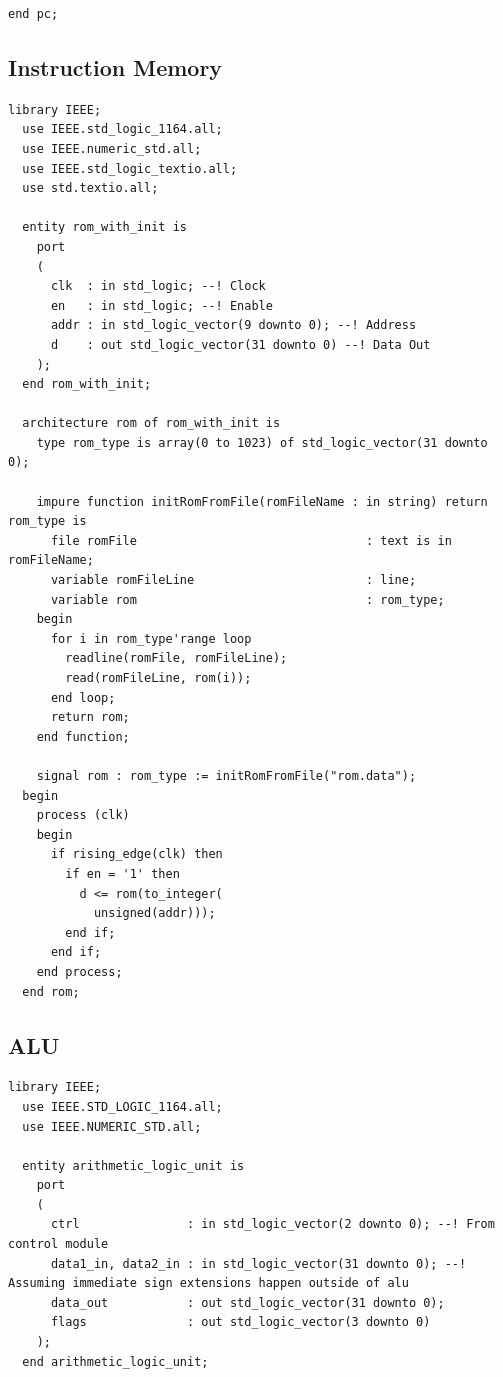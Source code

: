 \documentclass[lettersize,journal]{IEEEtran}
\begin{document}
{\begin{Verbatim}[breaklines]
  end pc;
\end{Verbatim}
\subsection{Instruction Memory}
\begin{Verbatim}[breaklines]
  library IEEE;
  use IEEE.std_logic_1164.all;
  use IEEE.numeric_std.all;
  use IEEE.std_logic_textio.all;
  use std.textio.all;
  
  entity rom_with_init is
    port
    (
      clk  : in std_logic; --! Clock
      en   : in std_logic; --! Enable
      addr : in std_logic_vector(9 downto 0); --! Address
      d    : out std_logic_vector(31 downto 0) --! Data Out
    );
  end rom_with_init;
  
  architecture rom of rom_with_init is
    type rom_type is array(0 to 1023) of std_logic_vector(31 downto 0);
  
    impure function initRomFromFile(romFileName : in string) return rom_type is
      file romFile                                : text is in romFileName;
      variable romFileLine                        : line;
      variable rom                                : rom_type;
    begin
      for i in rom_type'range loop
        readline(romFile, romFileLine);
        read(romFileLine, rom(i));
      end loop;
      return rom;
    end function;
  
    signal rom : rom_type := initRomFromFile("rom.data");
  begin
    process (clk)
    begin
      if rising_edge(clk) then
        if en = '1' then
          d <= rom(to_integer(
            unsigned(addr)));
        end if;
      end if;
    end process;
  end rom;
\end{Verbatim}
\subsection{ALU}
\begin{Verbatim}[breaklines]
  library IEEE;
  use IEEE.STD_LOGIC_1164.all;
  use IEEE.NUMERIC_STD.all;
  
  entity arithmetic_logic_unit is
    port
    (
      ctrl               : in std_logic_vector(2 downto 0); --! From control module
      data1_in, data2_in : in std_logic_vector(31 downto 0); --! Assuming immediate sign extensions happen outside of alu
      data_out           : out std_logic_vector(31 downto 0);
      flags              : out std_logic_vector(3 downto 0)
    );
  end arithmetic_logic_unit;
  

\end{Verbatim}}
\end{document}
